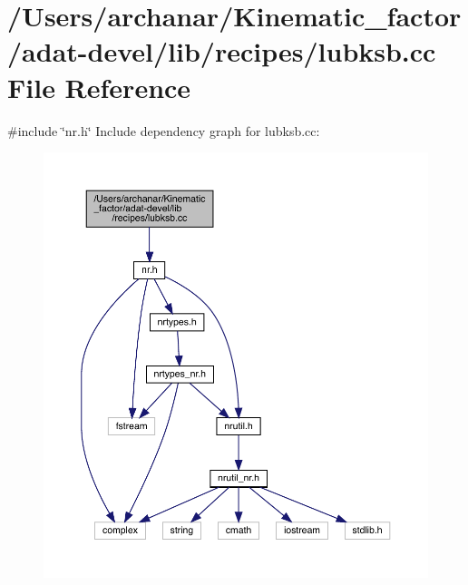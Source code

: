 \hypertarget{adat-devel_2lib_2recipes_2lubksb_8cc}{}\section{/\+Users/archanar/\+Kinematic\+\_\+factor/adat-\/devel/lib/recipes/lubksb.cc File Reference}
\label{adat-devel_2lib_2recipes_2lubksb_8cc}
{\ttfamily \#include \char`\"{}nr.\+h\char`\"{}}\newline
Include dependency graph for lubksb.\+cc\+:
\nopagebreak
\begin{figure}[H]
\begin{center}
\leavevmode
\includegraphics[width=350pt]{d8/d1b/adat-devel_2lib_2recipes_2lubksb_8cc__incl}
\end{center}
\end{figure}
